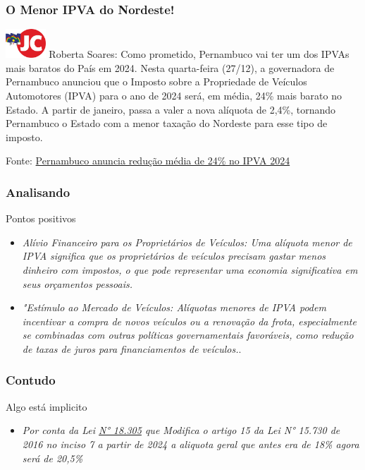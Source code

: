 \documentclass[compress,12pt]{beamer}
\begin{document}
\begin{frame}
\frametitle{O Menor IPVA do Nordeste!}
\centering
\vspace{-0.5cm}
\hspace{0.5cm}
    \newline
    {\begin{tcolorbox}[newspaper]\includegraphics[width=15mm]{Imagens/logo-jc2.webp.png} {Roberta Soares}: Como prometido, Pernambuco vai ter um dos IPVAs mais baratos do País em 2024. Nesta quarta-feira (27/12), a governadora de Pernambuco anunciou que o Imposto sobre a Propriedade de Veículos Automotores (IPVA) para o ano de 2024 será, em média, 24\% mais barato no Estado.
    A partir de janeiro, passa a valer a nova alíquota de 2,4\%, tornando Pernambuco o Estado com a menor taxação do Nordeste para esse tipo de imposto.

        \end{tcolorbox}}
   \centering
   \vspace{0.5cm}
     Fonte: \href{http://surl.li/rwukt}{Pernambuco anuncia redução média de 24\% no IPVA 2024}
\end{frame}

\begin{frame}
\frametitle{Analisando}
\begin{block}{Pontos positivos}
  \begin{itemize}
        \item \textit{Alívio Financeiro para os Proprietários de Veículos: Uma alíquota menor de IPVA significa que os proprietários de veículos precisam gastar menos dinheiro com impostos, o que pode representar uma economia significativa em seus orçamentos pessoais. }
        \item \textit{"Estímulo ao Mercado de Veículos: Alíquotas menores de IPVA podem incentivar a compra de novos veículos ou a renovação da frota, especialmente se combinadas com outras políticas governamentais favoráveis, como redução de taxas de juros para financiamentos de veículos.}.
        \newline
        \newline
    \end{itemize}
\end{block}
\end{frame}

\begin{frame}
\frametitle{Contudo}
\begin{block}{Algo está implicito}
  \begin{itemize}
        \item \textit{Por conta da Lei \href{https://l1nk.dev/i8ftt}{N° 18.305} que Modifica o artigo 15 da Lei N° 15.730 de 2016 no inciso 7 a partir de 2024 a aliquota geral que antes era de  18\% agora será de 20,5\%}
     
        \newline
        \newline
    \end{itemize}
\end{block}
\end{frame}
\end{document}

